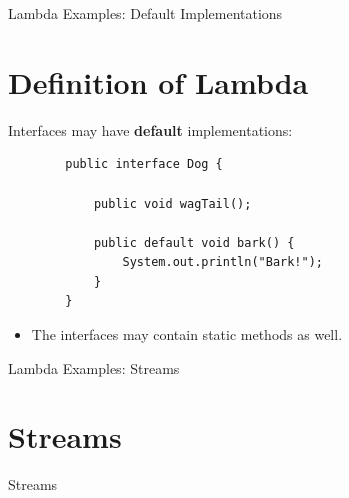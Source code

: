 \documentclass{beamer}
\begin{document}
	\begin{frame}[fragile]{Lambda Examples: Default Implementations }
		\section{Definition of Lambda}
		
		Interfaces may have \textbf{default} implementations: 
		\begin{lstlisting}
		public interface Dog {
		
		    public void wagTail();
			
		    public default void bark() {
		        System.out.println("Bark!");
		    }
		}
		\end{lstlisting}
		\begin{itemize}
			\item The interfaces may contain static methods as well.
		\end{itemize}
	\end{frame}
	
	\begin{frame}[fragile]{Lambda Examples: Streams}
		\section{Streams}

		\begin{center}
		\Huge Streams
		\end{center}


	\end{frame}	
\end{document}
